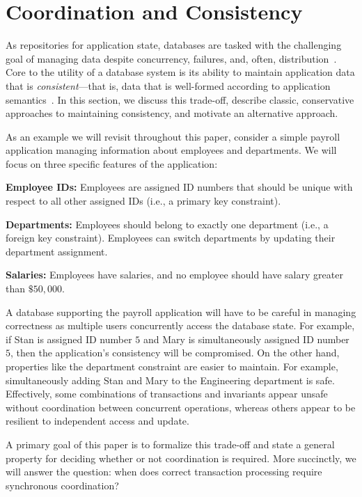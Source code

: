 
\section{Coordination and Consistency}
\label{sec:motivation}


As repositories for application state, databases are tasked with the
challenging goal of managing data despite concurrency, failures, and,
often, distribution~\cite{bernstein-book}. Core to the utility of a
database system is its ability to maintain application data that is
\textit{consistent}---that is, data that is well-formed according to
application semantics~\cite{gray-virtues}. In this section, we discuss
this trade-off, describe classic, conservative approaches to
maintaining consistency, and motivate an alternative approach.

 As an example we will revisit throughout
this paper, consider a simple payroll application managing information
about employees and departments. We will focus on three specific
features of the application:
\begin{myitemize}
\item\textbf{Employee IDs:} Employees are assigned ID numbers that
  should be unique with respect to all other assigned IDs (i.e., a
  primary key constraint).
  \item\textbf{Departments:} Employees should belong to exactly one
  department (i.e., a foreign key constraint). Employees can switch
  departments by updating their department assignment.
\item\textbf{Salaries:} Employees have salaries, and no employee
  should have salary greater than $\$50,000$.
\end{myitemize}
A database supporting the payroll application will have to be careful
in managing correctness as multiple users concurrently access the
database state. For example, if Stan is assigned ID number $5$ and
Mary is simultaneously assigned ID number $5$, then the application's
consistency will be compromised. On the other hand, properties like
the department constraint are easier to maintain. For example,
simultaneously adding Stan and Mary to the Engineering department is
safe. Effectively, some combinations of transactions and invariants
appear unsafe without coordination between concurrent operations,
whereas others appear to be resilient to independent access and
update.

A primary goal of this paper is to formalize this trade-off and state
a general property for deciding whether or not coordination is
required. More succinctly, we will answer the question: when does
correct transaction processing require synchronous coordination?

